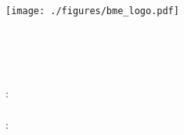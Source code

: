 \begin{titlepage}
  \begin{center}  
  \texttt{[image: ./figures/bme\_logo.pdf]}
  \vspace{0.3cm}
  
  \bme \\
  \vik \\
  \viktanszek \\
  \vspace{5cm}
  
  \huge {\vikcim}
  \vspace{1.5cm}
  
  \large {\textbf{\tdk}}
  \vfill
    
  {\Large 
  	\keszitette: \\ \vspace{0.3cm}
  	\szerzo \\
  	\vspace{1.5cm}
  	\konzulens: \\ \vspace{0.3cm}
  	\vikkonzulensA \\
  	\vikkonzulensB \\
  }
  
  \vspace{2cm}
  \large {\tdkev}
 \end{center}
\end{titlepage}

